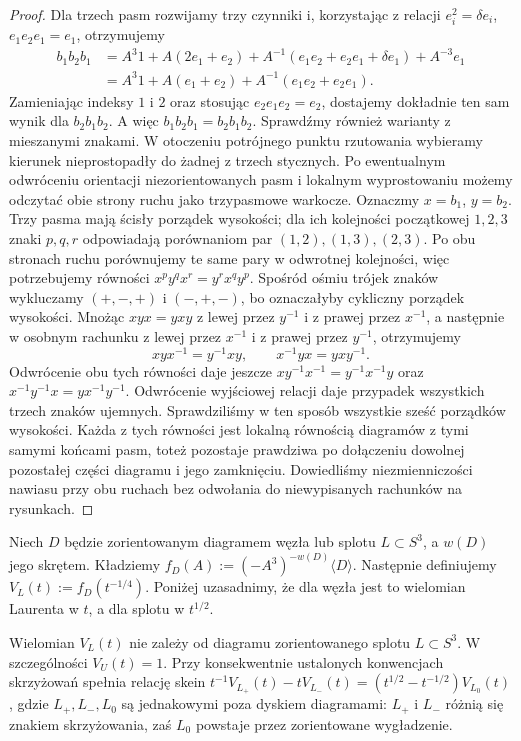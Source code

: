\begin{proof}
Dla trzech pasm rozwijamy trzy czynniki i,
korzystając z relacji $e_i^2=\delta e_i$,
$e_1e_2e_1=e_1$, otrzymujemy
\[
\begin{aligned}
b_1b_2b_1
&=A^3 1
+A(2e_1+e_2)
+A^{-1}(e_1e_2+e_2e_1+\delta e_1)
+A^{-3}e_1\\
&=A^3 1+A(e_1+e_2)
+A^{-1}(e_1e_2+e_2e_1).
\end{aligned}
\]
Zamieniając indeksy $1$ i $2$ oraz stosując
$e_2e_1e_2=e_2$, dostajemy dokładnie ten
sam wynik dla $b_2b_1b_2$.
A więc $b_1b_2b_1=b_2b_1b_2$.
Sprawdźmy również warianty z mieszanymi znakami.
W otoczeniu potrójnego punktu rzutowania wybieramy
kierunek nieprostopadły do żadnej z trzech stycznych.
Po ewentualnym odwróceniu orientacji niezorientowanych
pasm i lokalnym wyprostowaniu możemy odczytać obie
strony ruchu jako trzypasmowe warkocze.
Oznaczmy $x=b_1$, $y=b_2$.
Trzy pasma mają ścisły porządek wysokości; dla ich
kolejności początkowej $1,2,3$ znaki $p,q,r$ odpowiadają
porównaniom par $(1,2),(1,3),(2,3)$.
Po obu stronach ruchu porównujemy te same pary
w odwrotnej kolejności, więc potrzebujemy równości
$x^p y^q x^r=y^r x^q y^p$.
Spośród ośmiu trójek znaków wykluczamy
$(+,-,+)$ i $(-,+,-)$, bo oznaczałyby cykliczny
porządek wysokości. Mnożąc $xyx=yxy$ z lewej przez $y^{-1}$
i z prawej przez $x^{-1}$, a następnie w osobnym
rachunku z lewej przez $x^{-1}$ i z prawej
przez $y^{-1}$, otrzymujemy
\[
xyx^{-1}=y^{-1}xy,\qquad
x^{-1}yx=yxy^{-1}.
\]
Odwrócenie obu tych równości daje jeszcze
$xy^{-1}x^{-1}=y^{-1}x^{-1}y$ oraz
$x^{-1}y^{-1}x=yx^{-1}y^{-1}$.
Odwrócenie wyjściowej relacji daje przypadek
wszystkich trzech znaków ujemnych.
Sprawdziliśmy w ten sposób wszystkie sześć
porządków wysokości. Każda z tych równości jest lokalną równością
diagramów z tymi samymi końcami pasm, toteż
pozostaje prawdziwa po dołączeniu dowolnej
pozostałej części diagramu i jego zamknięciu.
Dowiedliśmy niezmienniczości nawiasu przy
obu ruchach bez odwołania do niewypisanych
rachunków na rysunkach.
\end{proof}

\begin{definicja}
Niech $D$ będzie zorientowanym diagramem węzła lub splotu
$L\subset S^3$, a $w(D)$ jego skrętem. Kładziemy
$f_D(A):=(-A^3)^{-w(D)}\langle D\rangle$.
Następnie definiujemy $V_L(t):=f_D(t^{-1/4})$.
Poniżej uzasadnimy, że dla węzła jest to wielomian
Laurenta w $t$, a dla splotu w $t^{1/2}$.
\end{definicja}

\begin{twierdzenie}
Wielomian $V_L(t)$ nie zależy od diagramu zorientowanego
splotu $L\subset S^3$. W szczególności $V_U(t)=1$.
Przy konsekwentnie ustalonych konwencjach skrzyżowań spełnia
relację skein
$t^{-1}V_{L_+}(t)-tV_{L_-}(t)=
(t^{1/2}-t^{-1/2})V_{L_0}(t)$,
gdzie $L_+,L_-,L_0$ są jednakowymi poza dyskiem diagramami:
$L_+$ i $L_-$ różnią się znakiem skrzyżowania, zaś $L_0$
powstaje przez zorientowane wygładzenie.
\end{twierdzenie}

